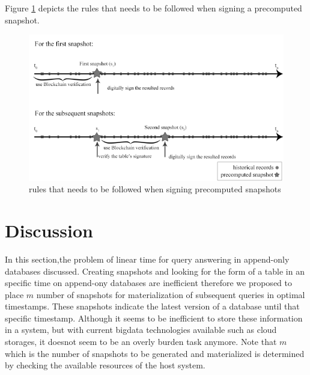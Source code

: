 			Figure \ref{fig:signing_snapshots} depicts the rules that needs to be followed when signing a precomputed snapshot.

			\begin{figure}
				\centering
				\includegraphics[width=\textwidth]{figs/signing_snapshots.pdf}
				\caption{rules that needs to be followed when signing precomputed snapshots}
				\label{fig:signing_snapshots}
			\end{figure}

	\section{Discussion}
		In this section,the problem of linear time for query answering in append-only databases discussed. Creating snapshots and looking for the form of a table in an specific time on append-ony databases are inefficient therefore we proposed to place $m$ number of snapshots for materialization of subsequent queries in optimal timestamps. These snapshots indicate the latest version of a database until that specific timestamp. Although it seems to be inefficient to store these information in a system, but with current bigdata technologies available such as cloud storages, it doesnot seem to be an overly burden task anymore. Note that $m$ which is the number of snapshots to be generated and materialized is determined by checking the available resources of the host system.

